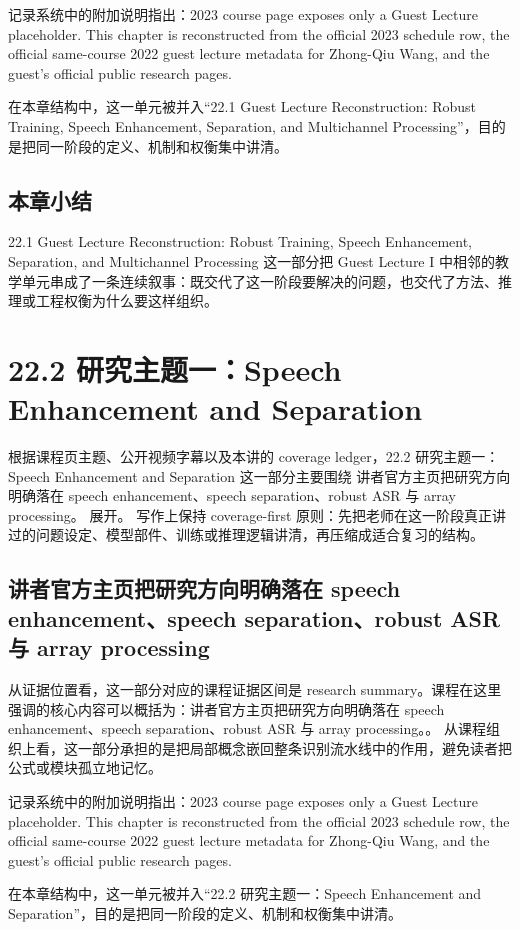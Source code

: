 \documentclass[a4paper]{article}
\begin{document}
记录系统中的附加说明指出：2023 course page exposes only a Guest Lecture placeholder. This chapter is reconstructed from the official 2023 schedule row, the official same-course 2022 guest lecture metadata for Zhong-Qiu Wang, and the guest's official public research pages.

在本章结构中，这一单元被并入“22.1 Guest Lecture Reconstruction: Robust Training, Speech Enhancement, Separation, and Multichannel Processing”，目的是把同一阶段的定义、机制和权衡集中讲清。

\subsection{本章小结}
22.1 Guest Lecture Reconstruction: Robust Training, Speech Enhancement, Separation, and Multichannel Processing 这一部分把 Guest Lecture I 中相邻的教学单元串成了一条连续叙事：既交代了这一阶段要解决的问题，也交代了方法、推理或工程权衡为什么要这样组织。

\section{22.2 研究主题一：Speech Enhancement and Separation}
根据课程页主题、公开视频字幕以及本讲的 coverage ledger，22.2 研究主题一：Speech Enhancement and Separation 这一部分主要围绕 讲者官方主页把研究方向明确落在 speech enhancement、speech separation、robust ASR 与 array processing。 展开。
写作上保持 coverage-first 原则：先把老师在这一阶段真正讲过的问题设定、模型部件、训练或推理逻辑讲清，再压缩成适合复习的结构。

\subsection{讲者官方主页把研究方向明确落在 speech enhancement、speech separation、robust ASR 与 array processing}
从证据位置看，这一部分对应的课程证据区间是 research summary。课程在这里强调的核心内容可以概括为：讲者官方主页把研究方向明确落在 speech enhancement、speech separation、robust ASR 与 array processing。。
从课程组织上看，这一部分承担的是把局部概念嵌回整条识别流水线中的作用，避免读者把公式或模块孤立地记忆。

记录系统中的附加说明指出：2023 course page exposes only a Guest Lecture placeholder. This chapter is reconstructed from the official 2023 schedule row, the official same-course 2022 guest lecture metadata for Zhong-Qiu Wang, and the guest's official public research pages.

在本章结构中，这一单元被并入“22.2 研究主题一：Speech Enhancement and Separation”，目的是把同一阶段的定义、机制和权衡集中讲清。
\end{document}
